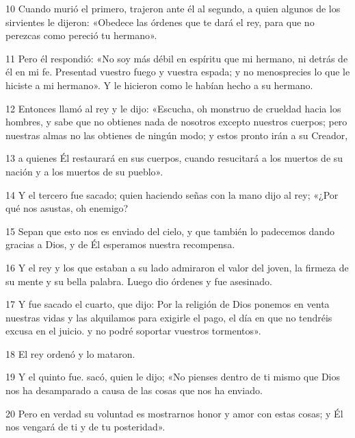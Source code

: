 \par 10 Cuando murió el primero, trajeron ante él al segundo, a quien algunos de los sirvientes le dijeron: «Obedece las órdenes que te dará el rey, para que no perezcas como pereció tu hermano».

\par 11 Pero él respondió: «No soy más débil en espíritu que mi hermano, ni detrás de él en mi fe. Presentad vuestro fuego y vuestra espada; y no menosprecies lo que le hiciste a mi hermano». Y le hicieron como le habían hecho a su hermano.

\par 12 Entonces llamó al rey y le dijo: «Escucha, oh monstruo de crueldad hacia los hombres, y sabe que no obtienes nada de nosotros excepto nuestros cuerpos; pero nuestras almas no las obtienes de ningún modo; y estos pronto irán a su Creador,

\par 13 a quienes Él restaurará en sus cuerpos, cuando resucitará a los muertos de su nación y a los muertos de su pueblo».

\par 14 Y el tercero fue sacado; quien haciendo señas con la mano dijo al rey; «¿Por qué nos asustas, oh enemigo?

\par 15 Sepan que esto nos es enviado del cielo, y que también lo padecemos dando gracias a Dios, y de Él esperamos nuestra recompensa.

\par 16 Y el rey y los que estaban a su lado admiraron el valor del joven, la firmeza de su mente y su bella palabra. Luego dio órdenes y fue asesinado.

\par 17 Y fue sacado el cuarto, que dijo: Por la religión de Dios ponemos en venta nuestras vidas y las alquilamos para exigirle el pago, el día en que no tendréis excusa en el juicio. y no podré soportar vuestros tormentos».

\par 18 El rey ordenó y lo mataron.

\par 19 Y el quinto fue. sacó, quien le dijo; «No pienses dentro de ti mismo que Dios nos ha desamparado a causa de las cosas que nos ha enviado.

\par 20 Pero en verdad su voluntad es mostrarnos honor y amor con estas cosas; y Él nos vengará de ti y de tu posteridad».

